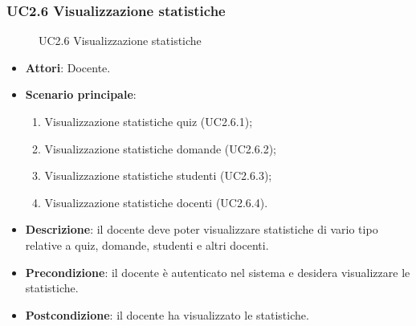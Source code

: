 \subsubsection{UC2.6 Visualizzazione statistiche}
\begin{figure}[H]
\centering
\noindent{}
\caption{UC2.6 Visualizzazione statistiche}
\end{figure}
\begin{itemize}
\item \textbf{Attori}: Docente.
\item \textbf{Scenario principale}:
\begin{enumerate}
\item Visualizzazione statistiche quiz (UC2.6.1);
\item Visualizzazione statistiche domande (UC2.6.2);
\item Visualizzazione statistiche studenti (UC2.6.3);
\item Visualizzazione statistiche docenti (UC2.6.4).
\end{enumerate}
\item \textbf{Descrizione}: il docente deve poter visualizzare statistiche di vario tipo relative a quiz, domande, studenti e altri docenti.
\item \textbf{Precondizione}: il docente è autenticato nel sistema e desidera visualizzare le statistiche.
\item \textbf{Postcondizione}: il docente ha visualizzato le statistiche.
\end{itemize}
